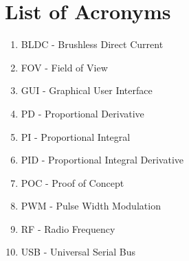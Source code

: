 \section{List of Acronyms}
\begin{enumerate}
	\item BLDC - Brushless Direct Current
	\item FOV - Field of View
	\item GUI - Graphical User Interface
	\item PD - Proportional Derivative
	\item PI - Proportional Integral
	\item PID - Proportional Integral Derivative
	\item POC - Proof of Concept
	\item PWM - Pulse Width Modulation
	\item RF - Radio Frequency
	\item USB - Universal Serial Bus
\end{enumerate}
